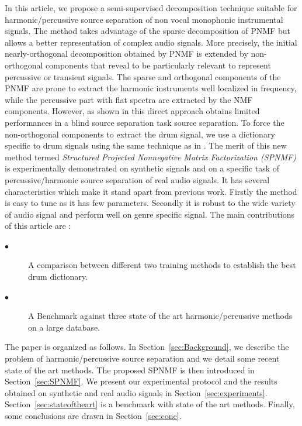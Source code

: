 \documentclass[journal]{IEEEtran}
\begin{document}
In this article, we propose a semi-supervised decomposition technique suitable for harmonic/percussive source separation of non vocal monophonic instrumental signals. The method takes advantage of the sparse decomposition of PNMF but allows a better representation of complex audio signals. More precisely, the initial nearly-orthogonal decomposition obtained by PNMF is extended by non-orthogonal components that reveal to be particularly relevant to represent percussive or transient signals. The sparse and orthogonal components of the PNMF are prone to extract the harmonic instruments well localized in frequency, while the percussive part with flat spectra are extracted by the NMF components. However, as shown in \cite{laroche2015structured} this direct approach obtains limited performances in a blind source separation task source separation. To force the non-orthogonal components to extract the drum signal, we use a dictionary specific to drum signals using the same technique as in \cite{wudrum}.
The merit of this new method termed \textit{Structured Projected Nonnegative Matrix Factorization (SPNMF)} is experimentally demonstrated on synthetic signals and on a specific task of percussive/harmonic source separation of real audio signals. It has several characteristics which make it stand apart from previous work. Firstly the method is easy to tune as it has few parameters. Secondly it is robust to the wide variety of audio signal and perform well on genre specific signal. The main contributions of this article are :
\begin{description}
\item[$\bullet$ ] A comparison between different two training methods to establish the best drum dictionary.
\item[$\bullet$ ] A Benchmark against three state of the art harmonic/percussive methods on a large database.
\end{description}


The paper is organized as follows. In Section~\ref{sec:Background}, we describe the problem of harmonic/percussive source separation and we detail some recent state of the art methods. The proposed SPNMF is then introduced in Section~\ref{sec:SPNMF}. We present our experimental protocol and the results obtained on synthetic and real audio signals in Section~\ref{sec:experiments}. Section~\ref{sec:stateoftheart} is a benchmark with state of the art methods. Finally, some conclusions are drawn in Section~\ref{sec:conc}.
\end{document}
